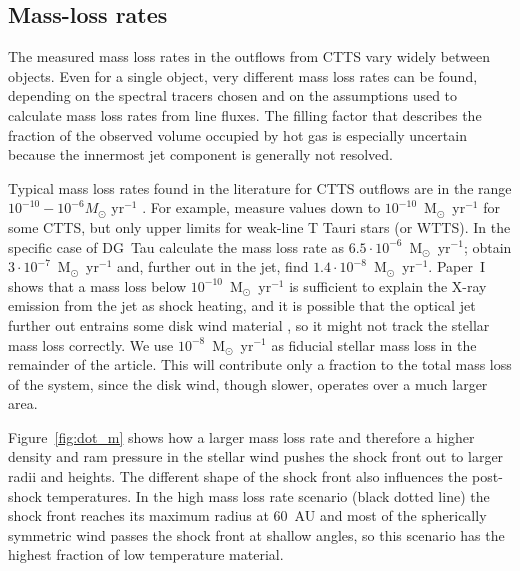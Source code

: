 \subsection{Mass-loss rates}
The measured mass loss rates in the outflows from CTTS vary widely between objects.  Even for a single object, very different mass loss rates can be found, depending on the spectral tracers chosen and on the assumptions used to calculate mass loss rates from line fluxes. The filling factor that describes the fraction of the observed volume occupied by hot gas is especially uncertain because the innermost jet component is generally not resolved.

Typical mass loss rates found in the literature for CTTS outflows are in the range $10^{-10}-10^{-6}M_{\odot}\textrm{ yr}^{-1}$ \citep{1999A&A...342..717B,2006A&A...456..189P}. For example, \citet{2006ApJ...646..319E} measure values down to $10^{-10}$~M$_{\odot}$~yr$^{-1}$ for some CTTS, but only upper limits for weak-line T Tauri stars (or WTTS). In the specific case of DG~Tau \citet{1997A&A...327..671L} calculate the  mass loss rate as $6.5\cdot 10^{-6}$~M$_{\odot}$~yr$^{-1}$; \citet{1995ApJ...452..736H}
obtain $3\cdot 10^{-7}$~M$_{\odot}$~yr$^{-1}$ and, further out in the jet, \citet{2000A&A...356L..41L} find $1.4\cdot 10^{-8}$~M$_{\odot}$~yr$^{-1}$. 
Paper~I shows that a mass loss below $10^{-10}$~M$_{\odot}$~yr$^{-1}$ is sufficient to explain the X-ray emission from the jet as shock heating, and it is possible that the optical jet further out entrains some disk wind material \citep{http://adsabs.harvard.edu/abs/2014arXiv1404.0728W}, so it might not track the stellar mass loss correctly.
We use $10^{-8}$~M$_{\odot}$~yr$^{-1}$ as fiducial stellar mass loss in the remainder of the article. This will contribute only a fraction to the total mass loss of the system, since the disk wind, though slower, operates over a much larger area.

Figure~\ref{fig:dot_m} shows how a larger mass loss rate and therefore a higher density and ram pressure in the stellar wind pushes the shock front out to larger radii and heights. The different shape of the shock front also influences the post-shock temperatures. In the high mass loss rate scenario (black dotted line) the shock front reaches its maximum radius at 60~AU and most of the spherically symmetric wind passes the shock front at shallow angles, so this scenario has the highest fraction of low temperature material.
